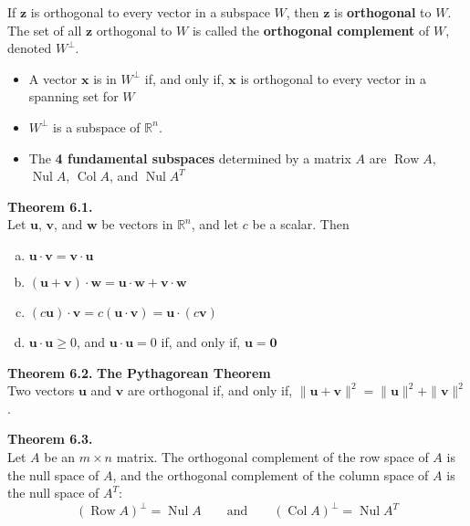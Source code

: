 \documentclass[10pt]{book}
\newenvironment{boxthm}{\begin{mdframed}[backgroundcolor=gray!30,nobreak=true]}{\end{mdframed}}
\newenvironment{boxdef}{\begin{mdframed}[backgroundcolor=gray!30,linewidth=0pt,nobreak=true]}{\end{mdframed}}
\newcommand{\R}{\mathbb{R}}
\newcommand{\vect}[1]{\ensuremath{\boldsymbol{\mathbf{#1}}}}
\DeclareMathOperator{\Nul}{Nul}
\DeclareMathOperator{\Col}{Col}
\DeclareMathOperator{\Row}{Row}
\begin{document}
\begin{itemize}
\begin{boxdef}
			If $\vect{z}$ is orthogonal to every vector in a subspace $W$, then $\vect{z}$ is \textbf{orthogonal} to $W$. The set of all $\vect{z}$ orthogonal to $W$ is called the \textbf{orthogonal complement} of $W$, denoted $W^\perp$.
		\end{boxdef}
		\begin{itemize}
			\item A vector $\vect{x}$ is in $W^\perp$ if, and only if, $\vect{x}$ is orthogonal to every vector in a spanning set for $W$
			\item $W^\perp$ is a subspace of $\R^n$.
			\item The \textbf{4 fundamental subspaces} determined by a matrix $A$ are $\Row A$, $\Nul A$, $\Col A$, and $\Nul A^T$
		\end{itemize}
\end{itemize}


\begin{boxthm}
	\textbf{Theorem 6.1.} \\
	Let $\vect{u}$, $\vect{v}$, and $\vect{w}$ be vectors in $\R^n$, and let $c$ be a scalar. Then
	\vspace{-1.5em}
	\begin{multicols}{2}
		\begin{enumerate}[(a)]\itemsep=0em
			\item $\vect{u}\cdot\vect{v}=\vect{v}\cdot\vect{u}$
			\item $(\vect{u}+\vect{v})\cdot\vect{w}=\vect{u}\cdot\vect{w}+\vect{v}\cdot\vect{w}$
			\item $(c\vect{u})\cdot\vect{v}=c(\vect{u}\cdot\vect{v})=\vect{u}\cdot(c\vect{v})$
			\item $\vect{u}\cdot\vect{u}\geq 0$, and $\vect{u}\cdot\vect{u}=0$ if, and only if, $\vect{u}=\vect{0}$
		\end{enumerate}
	\end{multicols}
\end{boxthm}
\vspace{-1ex}
\begin{boxthm}
	\textbf{Theorem 6.2.}
	\textbf{The Pythagorean Theorem} \\
	Two vectors $\vect{u}$ and $\vect{v}$ are orthogonal if, and only if, $\|\vect{u}+\vect{v}\|^2=\|\vect{u}\|^2+\|\vect{v}\|^2$.
\end{boxthm}
\vspace{-1ex}
\begin{boxthm}
	\textbf{Theorem 6.3.} \\
	Let $A$ be an $m\times n$ matrix. The orthogonal complement of the row space of $A$ is the null space of $A$, and the orthogonal complement of the column space of $A$ is the null space of $A^T$:
	$$ (\Row A)^\perp = \Nul A \qquad \text{and} \qquad
	(\Col A)^\perp = \Nul A^T $$
\end{boxthm}
\end{document}
